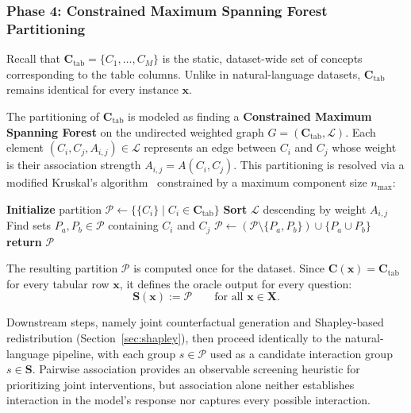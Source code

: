 \subsubsection{Phase 4: Constrained Maximum Spanning Forest Partitioning}

Recall that $\mathbf{C}_{\mathrm{tab}} = \{C_1, \ldots, C_M\}$ is the static, dataset-wide set of concepts corresponding to the table columns. Unlike in natural-language datasets, $\mathbf{C}_{\mathrm{tab}}$ remains identical for every instance $\mathbf{x}$.

The partitioning of $\mathbf{C}_{\mathrm{tab}}$ is modeled as finding a \textbf{Constrained Maximum Spanning Forest} on the undirected weighted graph $G = (\mathbf{C}_{\mathrm{tab}}, \mathcal{L})$. Each element $(C_i,C_j,A_{i,j})\in\mathcal{L}$ represents an edge between $C_i$ and $C_j$ whose weight is their association strength $A_{i,j}=A(C_i,C_j)$. This partitioning is resolved via a modified Kruskal's algorithm~\cite{kruskalShortestSpanningSubtree1956} constrained by a maximum component size $n_{\max}$:

\begin{algorithm}[H]
	\caption{Constrained Greedy Partitioning of Strongest Associations}\label{alg:greedy_merge}
	\begin{algorithmic}[1]
		\State \textbf{Initialize} partition $\mathcal{P} \gets \{ \{C_i\} \mid C_i \in \mathbf{C}_{\mathrm{tab}} \}$ 
		\State \textbf{Sort} $\mathcal{L}$ descending by weight $A_{i,j}$
		\State Find sets $P_a, P_b \in \mathcal{P}$ containing $C_i$ and $C_j$
		\State $\mathcal{P} \gets \left( \mathcal{P} \setminus \{P_a, P_b\} \right) \cup \{P_a \cup P_b\}$ 
		\EndIf
		\EndFor
		\State \textbf{return} $\mathcal{P}$
	\end{algorithmic}
\end{algorithm}

The resulting partition $\mathcal{P}$ is computed once for the dataset. Since $\mathbf{C}(\mathbf{x})=\mathbf{C}_{\mathrm{tab}}$ for every tabular row $\mathbf{x}$, it defines the oracle output for every question:
\begin{equation}
	\mathbf{S}(\mathbf{x}) := \mathcal{P}
	\qquad \text{for all } \mathbf{x}\in\mathbf{X}.
\end{equation}

Downstream steps, namely joint counterfactual generation and Shapley-based redistribution (Section~\ref{sec:shapley}), then proceed identically to the natural-language pipeline, with each group $s \in \mathcal{P}$ used as a candidate interaction group $s \in \mathbf{S}$. Pairwise association provides an observable screening heuristic for prioritizing joint interventions, but association alone neither establishes interaction in the model's response nor captures every possible interaction.

